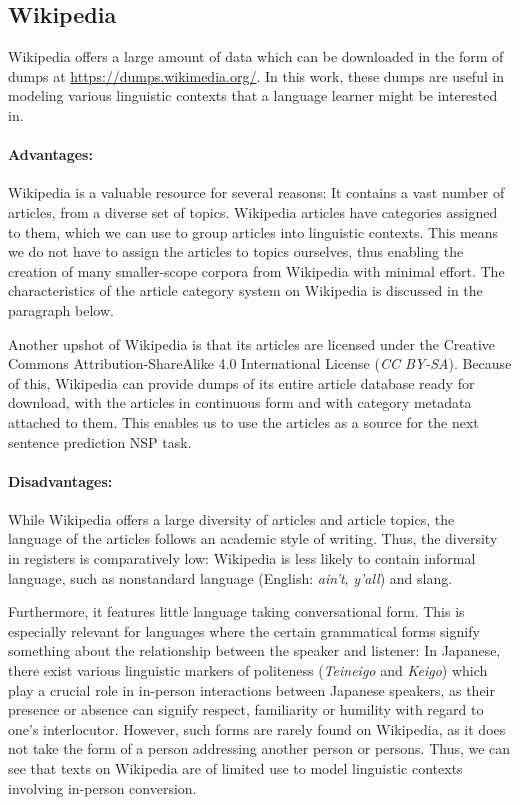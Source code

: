 \subsection{Wikipedia} \label{sec:wikipedia}
Wikipedia offers a large amount of data which can be downloaded in the form of dumps at \url{https://dumps.wikimedia.org/}.
In this work, these dumps are useful in modeling various linguistic contexts that a language learner might be interested in.

\paragraph{Advantages:}
Wikipedia is a valuable resource for several reasons:
It contains a vast number of articles, from a diverse set of topics.
Wikipedia articles have categories assigned to them, which we can use to group articles into linguistic contexts.
This means we do not have to assign the articles to topics ourselves, thus enabling the creation of many smaller-scope corpora from Wikipedia with minimal effort.
The characteristics of the article category system on Wikipedia is discussed in the paragraph below.

Another upshot of Wikipedia is that its articles are licensed under the Creative Commons Attribution-ShareAlike 4.0 International License (\textit{CC BY-SA}).
Because of this, Wikipedia can provide dumps of its entire article database ready for download, with the articles in continuous form and with category metadata attached to them.
This enables us to use the articles as a source for the next sentence prediction NSP task.

\paragraph{Disadvantages:}
While Wikipedia offers a large diversity of articles and article topics, the language of the articles follows an academic style of writing.
Thus, the diversity in registers is comparatively low:
Wikipedia is less likely to contain informal language, such as nonstandard language (English: \textit{ain't}, \textit{y'all}) and slang.

Furthermore, it features little language taking conversational form.
This is especially relevant for languages where the certain grammatical forms signify something about the relationship between the speaker and listener:
In Japanese, there exist various linguistic markers of politeness (\textit{Teineigo} and \textit{Keigo}) which play a crucial role in in-person interactions between Japanese speakers, as their presence or absence can signify respect, familiarity or humility with regard to one's interlocutor.
However, such forms are rarely found on Wikipedia, as it does not take the form of a person addressing another person or persons.
Thus, we can see that texts on Wikipedia are of limited use to model linguistic contexts involving in-person conversion.

